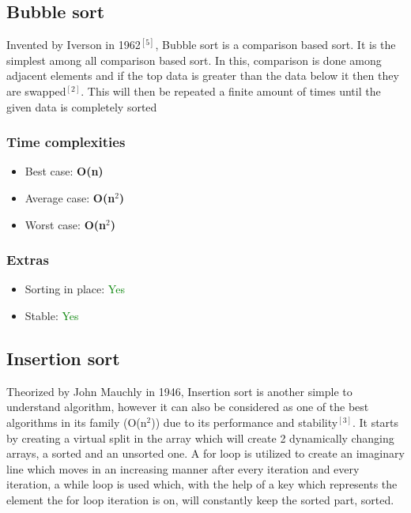 \documentclass{article}
\begin{document}
\begin{multicols}{2}
\titlespacing*{\subsection}
  {0pt}{4\baselineskip}{1.5\baselineskip}
  
\subsection{Bubble sort}

Invented by Iverson in 1962$^{[5]}$, Bubble sort is a comparison based sort. It is the simplest among all comparison based sort. In this, comparison is done among adjacent elements and if the top data is greater than the data below it then they are swapped$^{[2]}$. This will then be repeated a finite amount of times until the given data is completely sorted

\subsubsection{Time complexities}
\begin{itemize}
    \item Best case: \textbf{O(n)}
    \item Average case: \textbf{O(n$^2$)}
    \item Worst case: \textbf{O(n$^2$)}
\end{itemize}

\subsubsection{Extras}
\begin{itemize}
    \item Sorting in place: \textcolor{green}{Yes}
    \item Stable: \textcolor{green}{Yes}
\end{itemize}

\bigbreak \bigbreak \bigbreak \bigbreak \bigbreak \bigbreak \bigbreak \bigbreak \bigbreak \bigbreak \bigbreak \bigbreak



\subsection{Insertion sort}
Theorized by John Mauchly in 1946, Insertion sort is another simple to understand algorithm, however it can also be considered as one of the best algorithms in its family (O(n$^2$)) due to its performance and stability$^{[3]}$. It starts by creating a virtual split in the array which will create 2 dynamically changing arrays, a sorted and an unsorted one. A for loop is utilized to create an imaginary line which moves in an increasing manner after every iteration and every iteration, a while loop is used which, with the help of a key which represents the element the for loop iteration is on, will constantly keep the sorted part, sorted.

\end{multicols}
\end{document}
